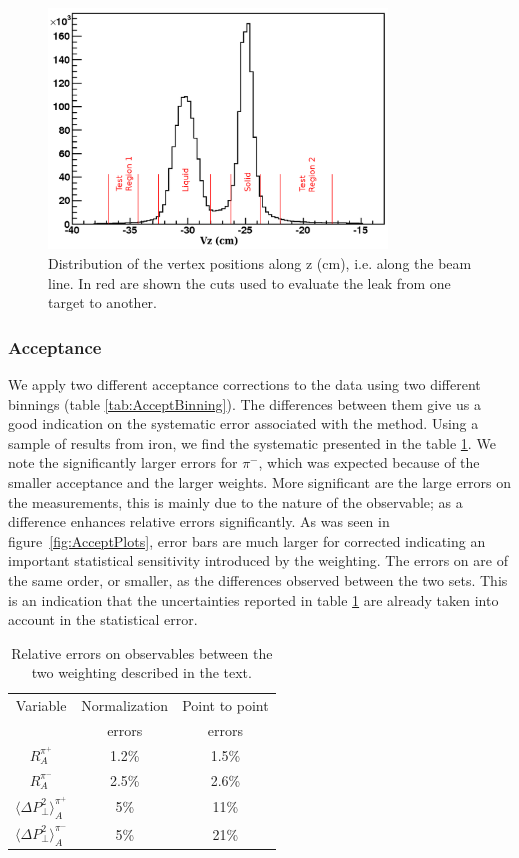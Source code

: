 \begin{figure}[tbp]
\centering
\includegraphics[width=9cm] {chap5-fig/Vertex.png}
\caption {Distribution of the vertex positions along z (cm), i.e. along the 
beam line. In red are shown the cuts used to evaluate the leak from one target to 
another.}
\label{fig:targetleak}
\end{figure}

\subsubsection{Acceptance}

We apply two different acceptance corrections to the data using two different binnings 
(table \ref{tab:AcceptBinning}). The differences between them give us a good 
indication on the systematic error associated with the method. Using a sample 
of results from iron, we find the systematic presented in the table 
\ref{tab:SysAcc}. We note the significantly larger errors for $\pi^-$, which 
was expected because of the smaller acceptance and the larger weights. More 
significant are the large errors on the \dpt measurements, this is mainly due to 
the nature of the observable; as a difference \dpt enhances relative errors 
significantly. As was seen in figure~\ref{fig:AcceptPlots}, error bars are much 
larger for corrected \dpt indicating an important statistical 
sensitivity introduced by the weighting. The errors on \dpt are of the same 
order, or smaller, as the differences observed between the two sets. This is 
an indication that the uncertainties reported in table \ref{tab:SysAcc} are already 
taken into account in the statistical error.

\begin{table}[htbp]
  \centering
\renewcommand{\arraystretch}{1.3}
  \begin{tabular}{|c|c|c|}
    \hline
    Variable & Normalization & Point to point \\ 
             & errors        & errors         \\ 
    \hline
    $R^{\pi^+}_A$  & 1.2\% & 1.5\%  \\
    $R^{\pi^-}_A$  & 2.5\% & 2.6\%   \\
    $\langle \Delta P_\perp^2 \rangle^{\pi^+}_A$ & 5\% & 11\% \\
    $\langle \Delta P_\perp^2 \rangle^{\pi^-}_A$ & 5\% & 21\% \\
    \hline
  \end{tabular}
  \caption{Relative errors on observables between the two weighting 
  described in the text.}
  \label{tab:SysAcc}
\end{table}

